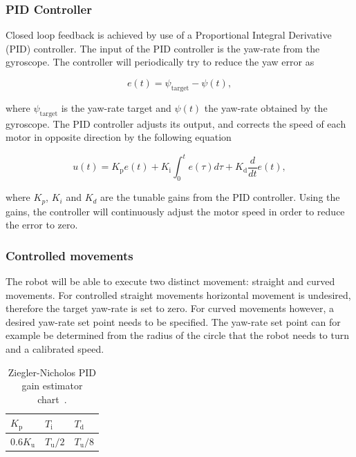 \subsubsection{PID Controller}


Closed loop feedback is achieved by use of a Proportional Integral Derivative (PID) controller.
The input of the PID controller is the yaw-rate from the gyroscope.
The controller will periodically try to reduce the yaw error as

\begin{equation}
	e(t) = \psi_{\text{target}} - \psi(t),
\end{equation}

\noindent
where $\psi_{\text{target}}$ is the yaw-rate target and $\psi(t)$ the yaw-rate obtained by the gyroscope.
The PID controller adjusts its output, and corrects the speed of each motor in opposite direction by the following equation

\begin{equation}
u(t) = K_{\text{p}}e(t) + K_{\text{i}} \int_{0}^{t}e(\tau)d\tau + K_{\text{d}}\frac{d}{dt}e(t),
\end{equation}

\noindent
where $K_{p}$, $K_{i}$ and $K_{d}$ are the tunable gains from the PID controller.
Using the gains, the controller will continuously adjust the motor speed in order to reduce the error to zero.

\subsubsection{Controlled movements}

The robot will be able to execute two distinct movement: straight and curved movements.
For controlled straight movements horizontal movement is undesired, therefore the target yaw-rate is set to zero.
For curved movements however, a desired yaw-rate set point needs to be specified.
The yaw-rate set point can for example be determined from the radius of the circle that the robot needs to turn and a calibrated speed.

\begin{table}[t]
	\centering
	\caption{Ziegler-Nicholos PID gain estimator chart~\cite{franklin_feedback_2015}.}
	\label{tab:gain_chart}
	\begin{tabular}{|l|l|l|} 
		\hline
		$K_{\text{p}}$ & $T_{\text{i}}$ & $T_{\text{d}}$ \\
		\hline \hline
		0.6$K_{\text{u}}$ & $T_{\text{u}}/2$ & $T_{\text{u}}/8$ \\
		\hline
	\end{tabular}
\end{table}

